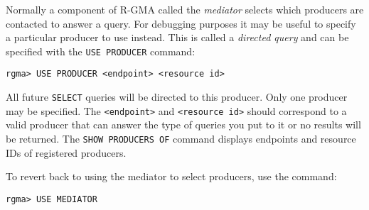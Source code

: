 Normally a component of R-GMA called the \emph{mediator} selects which
producers are contacted to answer a query. For debugging purposes it
may be useful to specify a particular producer to use instead. This is
called a \emph{directed query} and can be specified with the
\verb/USE PRODUCER/ command:

\begin{verbatim}
rgma> USE PRODUCER <endpoint> <resource id>
\end{verbatim}

All future \verb/SELECT/ queries will be directed to this
producer. Only one producer may be specified. The \verb/<endpoint>/ and
\verb/<resource id>/ should correspond to a valid producer that can
answer the type of queries you put to it or no results will be
returned. The \verb/SHOW PRODUCERS OF/ command displays endpoints and resource
IDs of registered producers.

To revert back to using the mediator to select producers, use the
command:

\begin{verbatim}
rgma> USE MEDIATOR
\end{verbatim}
